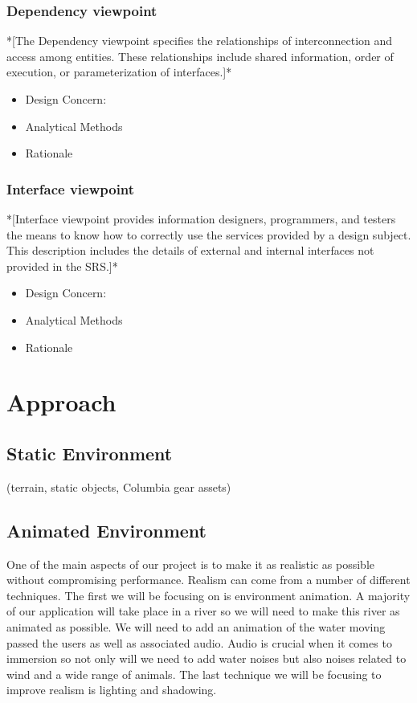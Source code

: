 \documentclass[10pt,journal,compsoc,onecolumn, draftclsnofoot]{IEEEtran}
\begin{document}
\subsubsection{Dependency viewpoint}
*[The Dependency viewpoint specifies the relationships of interconnection and access among entities. These relationships include shared information, order of execution, or parameterization of interfaces.]*
\begin{itemize}
  \item Design Concern:
  \item Analytical Methods
  \item Rationale
\end{itemize}

\subsubsection{Interface viewpoint}
*[Interface viewpoint provides information designers, programmers, and testers the means to know how to correctly use the services provided by a design subject. This description includes the details of external and internal interfaces not provided in the SRS.]*
\begin{itemize}
  \item Design Concern:
  \item Analytical Methods
  \item Rationale
\end{itemize}


\section{Approach}
\subsection{Static Environment}
(terrain, static objects, Columbia gear assets)

\subsection{Animated Environment}
One of the main aspects of our project is to make it as realistic as possible without compromising performance. Realism can come from a number of different techniques. The first we will be focusing on is environment animation. A majority of our application will take place in a river so we will need to make this river as animated as possible. We will need to add an animation of the water moving passed the users as well as associated audio. Audio is crucial when it comes to immersion so not only will we need to add water noises but also noises related to wind and a wide range of animals. The last technique we will be focusing to improve realism is lighting and shadowing.
\end{document}

